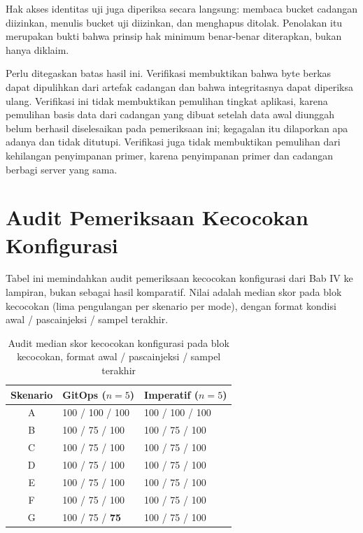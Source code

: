 Hak akses identitas uji juga diperiksa secara langsung: membaca bucket cadangan diizinkan, menulis bucket uji diizinkan, dan menghapus ditolak. Penolakan itu merupakan bukti bahwa prinsip hak minimum benar-benar diterapkan, bukan hanya diklaim.

Perlu ditegaskan batas hasil ini. Verifikasi membuktikan bahwa byte berkas dapat dipulihkan dari artefak cadangan dan bahwa integritasnya dapat diperiksa ulang. Verifikasi ini tidak membuktikan pemulihan tingkat aplikasi, karena pemulihan basis data dari cadangan yang dibuat setelah data awal diunggah belum berhasil diselesaikan pada pemeriksaan ini; kegagalan itu dilaporkan apa adanya dan tidak ditutupi. Verifikasi juga tidak membuktikan pemulihan dari kehilangan penyimpanan primer, karena penyimpanan primer dan cadangan berbagi server yang sama.

\section{Audit Pemeriksaan Kecocokan Konfigurasi}
\label{app:audit-kecocokan}

Tabel ini memindahkan audit pemeriksaan kecocokan konfigurasi dari Bab IV ke lampiran, bukan sebagai hasil komparatif. Nilai adalah median skor pada blok kecocokan (lima pengulangan per skenario per mode), dengan format kondisi awal / pascainjeksi / sampel terakhir.

\begin{table}[H]
  \centering
  \small
  \caption{Audit median skor kecocokan konfigurasi pada blok kecocokan, format awal / pascainjeksi / sampel terakhir}
  \label{tab:audit-kecocokan}
  \begin{tabularx}{\textwidth}{|c|X|X|}
    \hline
    Skenario & GitOps ($n=5$) & Imperatif ($n=5$) \\
    \hline
    A & 100 / 100 / 100 & 100 / 100 / 100 \\
    \hline
    B & 100 / 75 / 100 & 100 / 75 / 100 \\
    \hline
    C & 100 / 75 / 100 & 100 / 75 / 100 \\
    \hline
    D & 100 / 75 / 100 & 100 / 75 / 100 \\
    \hline
    E & 100 / 75 / 100 & 100 / 75 / 100 \\
    \hline
    F & 100 / 75 / 100 & 100 / 75 / 100 \\
    \hline
    G & 100 / 75 / \textbf{75} & 100 / 75 / 100 \\
    \hline
  \end{tabularx}
\end{table}

